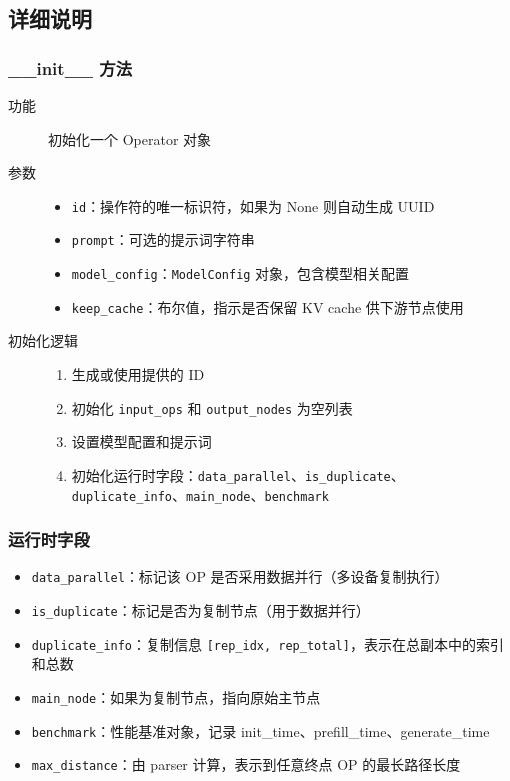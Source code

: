 \documentclass[12pt,a4paper]{article}
\begin{document}
\subsection{详细说明}

\subsubsection{\_\_init\_\_ 方法}
\begin{description}
    \item[功能] 初始化一个 Operator 对象
    \item[参数]
    \begin{itemize}
        \item \texttt{id}：操作符的唯一标识符，如果为 None 则自动生成 UUID
        \item \texttt{prompt}：可选的提示词字符串
        \item \texttt{model_config}：\texttt{ModelConfig} 对象，包含模型相关配置
        \item \texttt{keep_cache}：布尔值，指示是否保留 KV cache 供下游节点使用
    \end{itemize}
    \item[初始化逻辑]
    \begin{enumerate}
        \item 生成或使用提供的 ID
        \item 初始化 \texttt{input_ops} 和 \texttt{output_nodes} 为空列表
        \item 设置模型配置和提示词
        \item 初始化运行时字段：\texttt{data_parallel}、\texttt{is_duplicate}、\texttt{duplicate_info}、\texttt{main_node}、\texttt{benchmark}
    \end{enumerate}
\end{description}

\subsubsection{运行时字段}
\begin{itemize}
    \item \texttt{data_parallel}：标记该 OP 是否采用数据并行（多设备复制执行）
    \item \texttt{is_duplicate}：标记是否为复制节点（用于数据并行）
    \item \texttt{duplicate_info}：复制信息 \texttt{[rep\_idx, rep\_total]}，表示在总副本中的索引和总数
    \item \texttt{main_node}：如果为复制节点，指向原始主节点
    \item \texttt{benchmark}：性能基准对象，记录 init\_time、prefill\_time、generate\_time
    \item \texttt{max_distance}：由 parser 计算，表示到任意终点 OP 的最长路径长度
\end{itemize}
\end{document}
